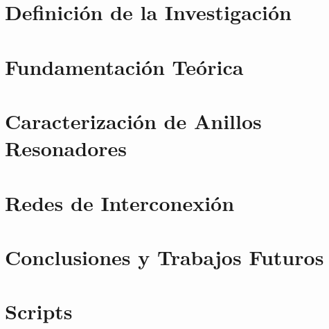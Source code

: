 
\makeindex



    
    
    

    \tableofcontents
    \listoffigures
    \listoftables
    \lstlistoflistings    

    \chapter{Definición de la Investigación}
        
 
    \chapter{Fundamentación Teórica}
    \label{ch:intro}
    
    
    
    
    \chapter{Caracterización de Anillos Resonadores}
    \label{ch:rr}

    
    
    

    \chapter{Redes de Interconexión}
    

    \chapter{Conclusiones y Trabajos Futuros}

    \appendix
    \chapter{Scripts}
    \label{ch:rr_scripts}

    

    
    


